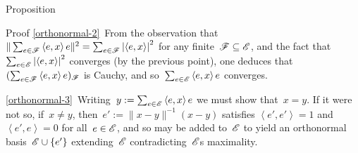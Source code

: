 \documentclass[a]{subfiles}
\begin{document}
\begin{parsec}
\begin{point}[orthonormal]{Proposition}
\begin{point}{Proof}
\ref{orthonormal-2}\ 
From the observation
that~$\|\sum_{e\in\mathscr{F}} \left<e,x\right>e\|^2
= \sum_{e\in \mathscr{F}} \left|\left<e,x\right>\right|^2$
for any finite~$\mathscr{F}\subseteq \mathscr{E}$,
and the fact that~$\sum_{e\in \mathscr{E}} \left|\left<e,x\right>\right|^2$
converges (by the previous point),
one deduces that~$(\sum_{e\in\mathscr{F}} \left<e,x\right>e)_{\mathscr{F}}$
is Cauchy,
and so~$\sum_{e\in\mathscr{E}} \left<e,x\right>e$
converges.

\ref{orthonormal-3}\
Writing~$y:=\sum_{e\in\mathscr{E}} \left<e,x\right>e$ we must show that~$x=y$.
If it were not so,
if~$x\neq y$,
then~$e':=\|x-y\|^{-1}(x-y)$
satisfies
$\left<e',e'\right>=1$
and
$\left<e',e\right>=0$
for all~$e\in\mathscr{E}$,
and so may be added to~$\mathscr{E}$
to yield an orthonormal basis~$\mathscr{E}\cup\{e'\}$
extending~$\mathscr{E}$
contradicting~$\mathscr{E}$s  maximality.


\end{point}
\end{point}
\end{parsec}
\end{document}
